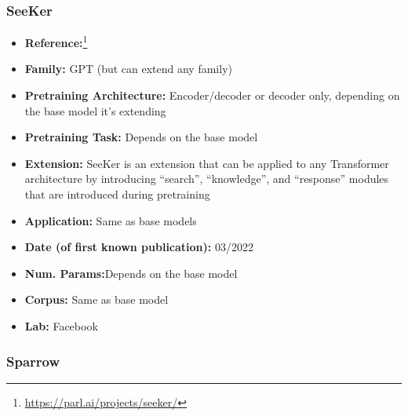 \documentclass{article}
\begin{document}
\subsubsection{SeeKer}

            \begin{itemize}
                \item \textbf{Reference:}\footnote{\url{https://parl.ai/projects/seeker/}}\cite{shuster2022language}
                \item \textbf{Family:} GPT (but can extend any family) 
                \item \textbf{Pretraining Architecture:} Encoder/decoder or decoder only, depending on the base model it’s extending
                \item \textbf{Pretraining Task:} Depends on the base model
                \item \textbf{Extension:} SeeKer is an extension that can be applied to any Transformer architecture by introducing “search”, “knowledge”, and “response” modules that are introduced during pretraining  
                \item \textbf{Application:} Same as base models
                \item \textbf{Date (of first known publication):} 03/2022
                \item \textbf{Num. Params:}Depends on the base model
                \item \textbf{Corpus:} Same as base model
                \item \textbf{Lab:} Facebook
            \end{itemize}

\subsubsection{Sparrow}
\end{document}
